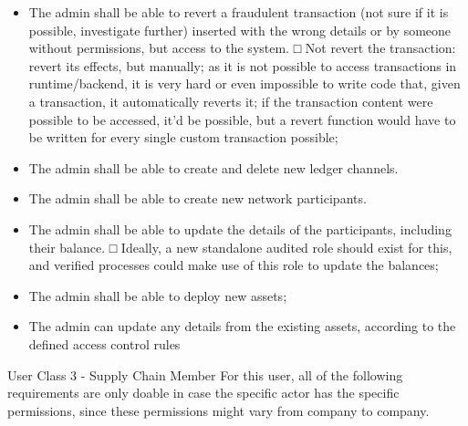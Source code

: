         \begin{itemize}
			\item The admin shall be able to revert a fraudulent transaction (not sure if it is possible, investigate further) inserted with the wrong details or by someone without permissions, but access to the system.
				□ Not revert the transaction: revert its effects, but manually; as it is not possible to access transactions in runtime/backend, it is very hard or even impossible to write code that, given a transaction, it automatically reverts it; if the transaction content were possible to be accessed, it'd be possible, but a revert function would have to be written for every single custom transaction possible;
			\item The admin shall be able to create and delete new ledger channels.
			\item The admin shall be able to create new network participants.
			\item The admin shall be able to update the details of the participants, including their balance.
				□ Ideally, a new standalone audited role should exist for this, and verified processes could make use of this role to update the balances;
			\item The admin shall be able to deploy new assets;
			\item The admin can update any details from the existing assets, according to the defined access control rules
		\end{itemize}
		\par User Class 3 - Supply Chain Member
        For this user, all of the following requirements are only doable in case the specific actor has the specific permissions, since these permissions might vary from company to company.
        
